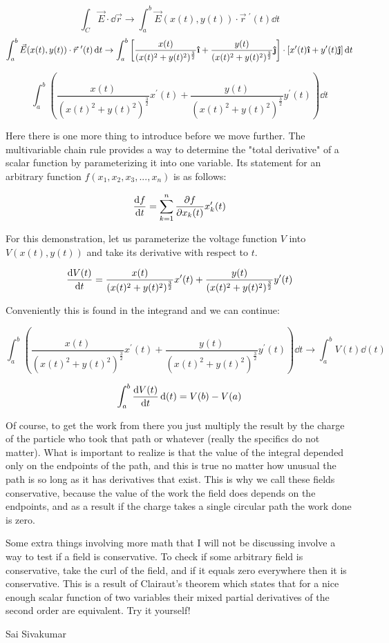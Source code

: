 \documentclass[11pt]{article}
\newcommand{\ihat}{\boldsymbol{\hat{\textbf{\i}}}}
\newcommand{\jhat}{\boldsymbol{\hat{\textbf{\j}}}}
\newcommand{\dr}{\vec{r}~^{\prime}(t)}
\newcommand{\dx}{x^{\prime}(t)}
\newcommand{\dy}{y^{\prime}(t)}
\begin{document}
$$\int_C \vec{E}\cdot\dd{\vec{r}} \to \int_a^b \vec{E}(x(t),y(t))\cdot \dr \dd{t}$$
$$\int_a^b \vec{E}(x(t),y(t))\cdot \dr \dd{t} \to \int_a^b \left[\frac{x(t)}{(x(t)^2+y(t)^2)^\frac{3}{2}} \ihat + \frac{y(t)}{(x(t)^2+y(t)^2)^\frac{3}{2}} \jhat\right] \cdot \left[ \dx \ihat + \dy \jhat\right] \dd{t}$$

$$\int_a^b \left(\frac{x(t)}{(x(t)^2+y(t)^2)^\frac{3}{2}}\dx + \frac{y(t)}{(x(t)^2+y(t)^2)^\frac{3}{2}}\dy\right)\dd{t}$$

Here there is one more thing to introduce before we move further. The multivariable chain rule provides a way to determine the "total derivative" of a scalar function by parameterizing it into one variable. Its statement for an arbitrary function $f(x_1,x_2,x_3,...,x_n)$ is as follows: 

$$\dv{f}{t} = \sum_{k = 1}^n \pdv{f}{x_k (t)}x_k^{\prime}(t)$$

For this demonstration, let us parameterize the voltage function $V$ into $V(x(t),y(t))$ and take its derivative with respect to $t$.

$$\dv{V(t)}{t} = \frac{x(t)}{(x(t)^2+y(t)^2)^\frac{3}{2}}\dx + \frac{y(t)}{(x(t)^2+y(t)^2)^\frac{3}{2}}\dy$$

Conveniently this is found in the integrand and we can continue:

$$\int_a^b \left(\frac{x(t)}{(x(t)^2+y(t)^2)^\frac{3}{2}}\dx + \frac{y(t)}{(x(t)^2+y(t)^2)^\frac{3}{2}}\dy\right)\dd{t} \to \int_a^b V(t) \dd(t)$$

$$\int_a^b \dv{V(t)}{t} \dd(t) = V(b) - V(a)$$

Of course, to get the work from there you just multiply the result by the charge of the particle who took that path or whatever (really the specifics do not matter). What is important to realize is that the value of the integral depended only on the endpoints of the path, and this is true no matter how unusual the path is so long as it has derivatives that exist. This is why we call these fields conservative, because the value of the work the field does depends on the endpoints, and as a result if the charge takes a single circular path the work done is zero.

Some extra things involving more math that I will not be discussing involve a way to test if a field is conservative. To check if some arbitrary field is conservative, take the curl of the field, and if it equals zero everywhere then it is conservative. This is a result of Clairaut's theorem which states that  for a nice enough scalar function of two variables their mixed partial derivatives of the second order are equivalent. Try it yourself!

\begin{flushright}
Sai Sivakumar
\end{flushright}
\end{document}
